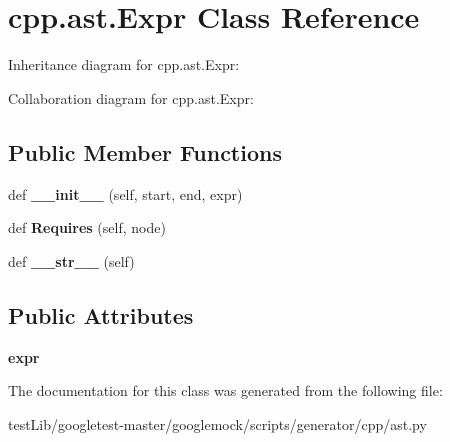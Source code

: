 \hypertarget{classcpp_1_1ast_1_1Expr}{}\section{cpp.\+ast.\+Expr Class Reference}
\label{classcpp_1_1ast_1_1Expr}


Inheritance diagram for cpp.\+ast.\+Expr\+:


Collaboration diagram for cpp.\+ast.\+Expr\+:
\subsection*{Public Member Functions}
\begin{DoxyCompactItemize}
\item 
\mbox{\label{classcpp_1_1ast_1_1Expr_adc83f4b17d6e28a39781678692eb25aa}} 
def {\bfseries \+\_\+\+\_\+init\+\_\+\+\_\+} (self, start, end, expr)
\item 
\mbox{\label{classcpp_1_1ast_1_1Expr_a9c92416eb1285068f190dcda8fd33682}} 
def {\bfseries Requires} (self, node)
\item 
\mbox{\label{classcpp_1_1ast_1_1Expr_a7ee1896fbfa7819adbd0b2f89d11ecec}} 
def {\bfseries \+\_\+\+\_\+str\+\_\+\+\_\+} (self)
\end{DoxyCompactItemize}
\subsection*{Public Attributes}
\begin{DoxyCompactItemize}
\item 
\mbox{\label{classcpp_1_1ast_1_1Expr_a2f4e13fb0176f2616f8703103c806462}} 
{\bfseries expr}
\end{DoxyCompactItemize}


The documentation for this class was generated from the following file\+:\begin{DoxyCompactItemize}
\item 
test\+Lib/googletest-\/master/googlemock/scripts/generator/cpp/ast.\+py\end{DoxyCompactItemize}
